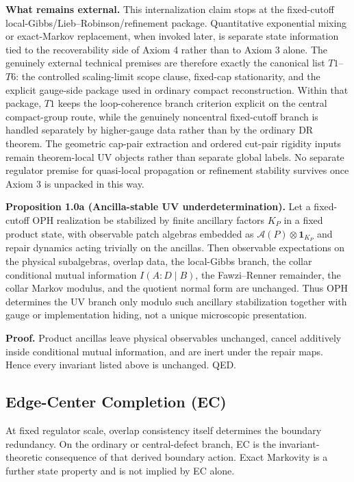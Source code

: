 \textbf{What remains external.} This internalization claim stops at the fixed-cutoff local-Gibbs/Lieb--Robinson/refinement package. Quantitative exponential mixing or exact-Markov replacement, when invoked later, is separate state information tied to the recoverability side of Axiom 4 rather than to Axiom 3 alone. The genuinely external technical premises are therefore exactly the canonical list \(T1\)--\(T6\): the controlled scaling-limit scope clause, fixed-cap stationarity, and the explicit gauge-side package used in ordinary compact reconstruction. Within that package, \(T1\) keeps the loop-coherence branch criterion explicit on the central compact-group route, while the genuinely noncentral fixed-cutoff branch is handled separately by higher-gauge data rather than by the ordinary DR theorem. The geometric cap-pair extraction and ordered cut-pair rigidity inputs remain theorem-local UV objects rather than separate global labels. No separate regulator premise for quasi-local propagation or refinement stability survives once Axiom 3 is unpacked in this way.

\textbf{Proposition 1.0a (Ancilla-stable UV underdetermination).} Let a fixed-cutoff OPH realization be stabilized by finite ancillary factors \(K_P\) in a fixed product state, with observable patch algebras embedded as \(\mathcal A(P)\otimes \mathbf 1_{K_P}\) and repair dynamics acting trivially on the ancillas. Then observable expectations on the physical subalgebras, overlap data, the local-Gibbs branch, the collar conditional mutual information \(I(A:D\mid B)\), the Fawzi--Renner remainder, the collar Markov modulus, and the quotient normal form are unchanged. Thus OPH determines the UV branch only modulo such ancillary stabilization together with gauge or implementation hiding, not a unique microscopic presentation.

\textbf{Proof.} Product ancillas leave physical observables unchanged, cancel additively inside conditional mutual information, and are inert under the repair maps. Hence every invariant listed above is unchanged. QED.

\subsection{Edge-Center Completion (EC)}\label{13-edge-center-completion-ec}

At fixed regulator scale, overlap consistency itself determines the boundary redundancy. On the
ordinary or central-defect branch, EC is the invariant-theoretic consequence of that derived
boundary action. Exact Markovity is a further state property and is not implied by EC alone.

